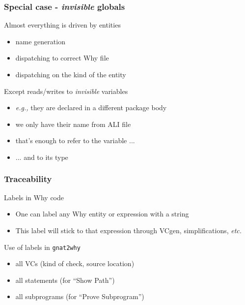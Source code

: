 \documentclass{beamer}
\newcommand{\etc}{\textit{etc.}\xspace}
\newcommand{\eg}{\textit{e.g.,}\xspace}
\newenvironment{specialframe}{%
  \begin{frame}[fragile,environment=specialframe]}{\end{frame}}
\begin{document}
\begin{specialframe}\frametitle{Special case - \emph{invisible} globals}
   \begin{block}{Almost everything is driven by entities}
      \begin{itemize}
         \item name generation
         \item dispatching to correct Why file
         \item dispatching on the kind of the entity
      \end{itemize}
   \end{block}
   \begin{block}{Except reads/writes to \emph{invisible} variables}
      \begin{itemize}
      \item  \eg they are declared in a different package body
         \item we only have their name from ALI file
         \item that's enough to refer to the variable ...
         \item ... and to its type
      \end{itemize}
   \end{block}
\end{specialframe}

\begin{specialframe}\frametitle{Traceability}
   \begin{block}{Labels in Why code}
      \begin{itemize}
         \item One can label any Why entity or expression with a string
         \item This label will stick to that expression through VCgen,
         simplifications, \etc
      \end{itemize}
   \end{block}
   \begin{block}{Use of labels in \texttt{gnat2why}}
      \begin{itemize}
         \item all VCs (kind of check, source location)
         \item all statements (for ``Show Path'')
         \item all subprograms (for ``Prove Subprogram'')
      \end{itemize}
   \end{block}
\end{specialframe}
\end{document}
